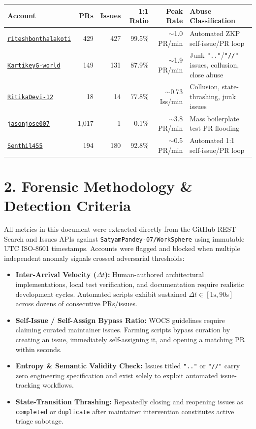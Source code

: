 \documentclass[11pt,a4paper]{article}
\begin{document}
\vspace{4pt}
\begin{center}
\begin{tabular}{@{}lrrrrp{5.2cm}@{}}
\toprule
\textbf{Account} & \textbf{PRs} & \textbf{Issues} & \textbf{1:1 Ratio} & \textbf{Peak Rate} & \textbf{Abuse Classification} \\
\midrule
\href{https://github.com/riteshbonthalakoti}{\texttt{riteshbonthalakoti}} & 429 & 427 & 99.5\% & $\sim$1.0 PR/min & Automated ZKP self-issue/PR loop \\
\href{https://github.com/KartikeyG-world}{\texttt{KartikeyG-world}} & 149 & 131 & 87.9\% & $\sim$1.9 PR/min & Junk \texttt{".."}/\texttt{"//"} issues, collusion, close abuse \\
\href{https://github.com/RitikaDevi-12}{\texttt{RitikaDevi-12}} & 18 & 14 & 77.8\% & $\sim$0.73 Iss/min & Collusion, state-thrashing, junk issues \\
\href{https://github.com/jasonjose007}{\texttt{jasonjose007}} & 1,017 & 1 & 0.1\% & $\sim$3.8 PR/min & Mass boilerplate test PR flooding \\
\href{https://github.com/Senthil455}{\texttt{Senthil455}} & 194 & 180 & 92.8\% & $\sim$0.5 PR/min & Automated 1:1 self-issue/PR loop \\
\bottomrule
\end{tabular}
\end{center}

\section{2. Forensic Methodology \& Detection Criteria}
All metrics in this document were extracted directly from the GitHub REST Search and Issues APIs against \texttt{SatyamPandey-07/WorkSphere} using immutable UTC ISO-8601 timestamps. Accounts were flagged and blocked when multiple independent anomaly signals crossed adversarial thresholds:
\begin{itemize}[leftmargin=1.5em, itemsep=3pt]
  \item \textbf{Inter-Arrival Velocity ($\Delta t$):} Human-authored architectural implementations, local test verification, and documentation require realistic development cycles. Automated scripts exhibit sustained $\Delta t \in [1\text{s}, 90\text{s}]$ across dozens of consecutive PRs/issues.
  \item \textbf{Self-Issue / Self-Assign Bypass Ratio:} WOCS guidelines require claiming curated maintainer issues. Farming scripts bypass curation by creating an issue, immediately self-assigning it, and opening a matching PR within seconds.
  \item \textbf{Entropy & Semantic Validity Check:} Issues titled \texttt{".."} or \texttt{"//"} carry zero engineering specification and exist solely to exploit automated issue-tracking workflows.
  \item \textbf{State-Transition Thrashing:} Repeatedly closing and reopening issues as \texttt{completed} or \texttt{duplicate} after maintainer intervention constitutes active triage sabotage.
\end{itemize}
\end{document}
